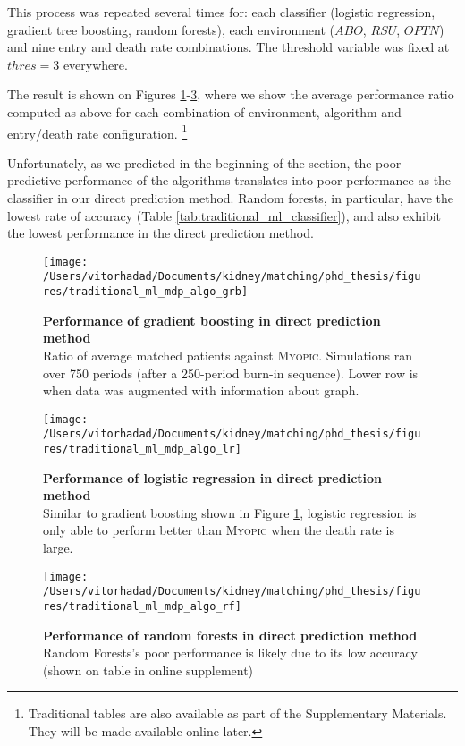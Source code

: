 \documentclass[format=acmsmall, review=false]{acmart}
\begin{document}
This process was repeated several times for: each classifier (logistic regression, gradient tree boosting, random forests), each environment ($ABO$, $RSU$, $OPTN$) and nine entry and death rate combinations. The threshold variable was fixed at $thres = 3$ everywhere.

The result is shown on Figures \ref{fig:traditional_ml_mdp_algo_grb}-\ref{fig:traditional_ml_mdp_algo_rf}, where we show the average performance ratio computed as above for each combination of environment, algorithm and entry/death rate configuration. \footnote{Traditional tables are also available as part of the Supplementary Materials. They will be made available online later.}

Unfortunately, as we predicted in the beginning of the section, the poor predictive performance of the algorithms translates into poor performance as the classifier in our direct prediction method. Random forests, in particular, have the lowest rate of accuracy (Table \ref{tab:traditional_ml_classifier}), and also exhibit the lowest performance in the direct prediction method.


\begin{figure}
\centering
\texttt{[image: /Users/vitorhadad/Documents/kidney/matching/phd\_thesis/figures/traditional\_ml\_mdp\_algo\_grb]}
\caption{\textbf{Performance of gradient boosting in direct prediction method} \\
    Ratio of average matched patients against \textsc{Myopic}. Simulations ran over 750 periods (after a 250-period burn-in sequence). Lower row is when data was augmented with information about graph.}
\label{fig:traditional_ml_mdp_algo_grb}
\end{figure}

\begin{figure}
\centering
\texttt{[image: /Users/vitorhadad/Documents/kidney/matching/phd\_thesis/figures/traditional\_ml\_mdp\_algo\_lr]}
\caption{\textbf{Performance of logistic regression in direct prediction method} \\
    Similar to gradient boosting shown in Figure \ref{fig:traditional_ml_mdp_algo_grb}, logistic regression is only able to perform better than \textsc{Myopic} when the death rate is large.}
\label{fig:traditional_ml_mdp_algo_lr}
\end{figure}

\begin{figure}
\centering
\texttt{[image: /Users/vitorhadad/Documents/kidney/matching/phd\_thesis/figures/traditional\_ml\_mdp\_algo\_rf]}
\caption{\textbf{Performance of random forests in direct prediction method} \\
    Random Forests's poor performance is likely due to its low accuracy (shown on table in online supplement)}
\label{fig:traditional_ml_mdp_algo_rf}
\end{figure}
\end{document}
